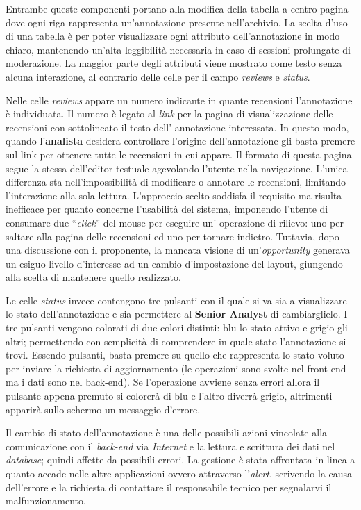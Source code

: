 Entrambe queste componenti portano alla modifica della tabella a centro pagina
dove ogni riga rappresenta un'annotazione presente nell'archivio. La scelta
d'uso di una tabella è per poter visualizzare ogni attributo dell'annotazione
in modo chiaro, mantenendo un'alta leggibilità necessaria in caso di sessioni
prolungate di moderazione. La maggior parte degli attributi viene mostrato come
testo senza alcuna interazione, al contrario delle celle per il campo
\textit{reviews} e \textit{status}.

Nelle celle \textit{reviews} appare un numero indicante in quante recensioni
l'annotazione è individuata. Il numero è legato al \textit{link} per
la pagina di visualizzazione delle recensioni con sottolineato il testo dell'
annotazione interessata. In questo modo, quando l'\textbf{analista} desidera
controllare l'origine dell'annotazione gli basta premere sul link per ottenere
tutte le recensioni in cui appare. Il formato di questa pagina segue la stessa
dell'editor testuale agevolando l'utente nella navigazione. L'unica differenza
sta nell'impossibilità di modificare o annotare le recensioni, limitando
l'interazione alla sola lettura. L'approccio scelto soddisfa il requisito ma
risulta inefficace per quanto concerne l'usabilità del sistema, imponendo
l'utente di consumare due ``\textit{click}'' del mouse per eseguire un'
operazione di rilievo: uno per saltare alla pagina delle recensioni ed uno per
tornare indietro. Tuttavia, dopo una discussione con il proponente, la mancata
visione di un'\textit{opportunity} generava un esiguo livello d'interesse ad un
cambio d'impostazione del layout, giungendo alla scelta di mantenere quello
realizzato.

Le celle \textit{status} invece contengono tre pulsanti con il quale si va sia a
visualizzare lo stato dell'annotazione e sia permettere al
\textbf{Senior Analyst} di cambiarglielo. I tre pulsanti vengono colorati di due
colori distinti: blu lo stato attivo e grigio gli altri; permettendo con
semplicità di comprendere in quale stato l'annotazione si trovi. Essendo
pulsanti, basta premere su quello che rappresenta lo stato voluto per inviare la
richiesta di aggiornamento (le operazioni sono svolte nel \gls{front-end} ma i
dati sono nel \gls{back-end}). Se l'operazione avviene senza errori allora il
pulsante appena premuto si colorerà di blu e l'altro diverrà grigio, altrimenti
apparirà sullo schermo un messaggio d'errore.

Il cambio di stato dell'annotazione è una delle possibili azioni vincolate alla
comunicazione con il \textit{back-end} via \textit{Internet} e la lettura e
scrittura dei dati nel \textit{database}; quindi affette da possibili errori.
La gestione è stata affrontata in linea a quanto accade nelle altre
applicazioni ovvero attraverso l'\textit{alert}, scrivendo la causa dell'errore
e la richiesta di contattare il responsabile tecnico per segnalarvi il
malfunzionamento.


